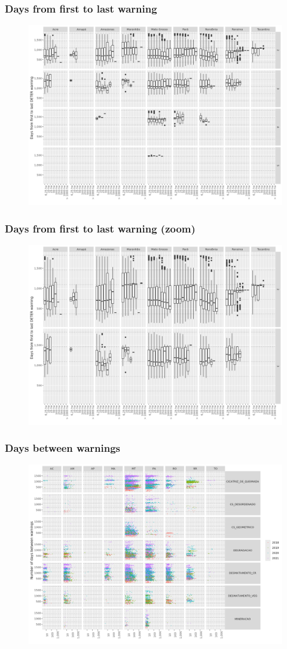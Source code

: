 \documentclass[aspectratio=169]{beamer}
\begin{document}
\begin{frame}
    \frametitle{Days from first to last warning}
    \begin{figure}[h]
        \includegraphics[width=0.75\linewidth]
        {./figures/plot_deter_days_first_to_last.png}
    \end{figure}
\end{frame}

\begin{frame}
    \frametitle{Days from first to last warning (zoom)}
    \begin{figure}[h]
        \includegraphics[width=0.75\linewidth]
        {./figures/plot_deter_days_first_to_last_zoom.png}
    \end{figure}
\end{frame}

\begin{frame}
    \frametitle{Days between warnings}
    \begin{figure}[h]
        \includegraphics[width=0.75\linewidth]
        {./figures/plot_deter_subarea_density_by_state_first-type_nwarnings.png}
    \end{figure}
\end{frame}
\end{document}

